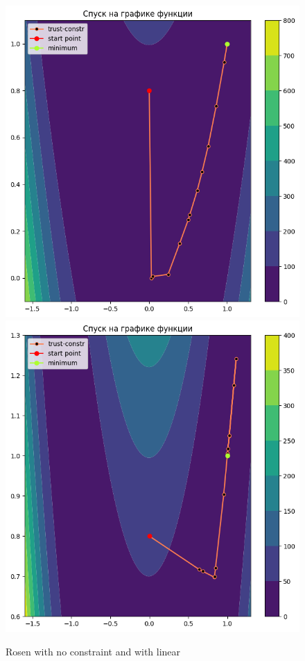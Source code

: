 \documentclass[12pt, a4paper, oneside, final]{article}
\begin{document}
	\begin{figure}[H]
		\centering
		\includegraphics[scale = 0.475]{Image/AT_ROSEN_NO_CONSTRAINT.png}
		\includegraphics[scale = 0.475]{Image/AT_ROSEN_LINEAR_CONSTRAINT.png}
		\caption*{Rosen with no constraint and with linear}
	\end{figure}
\end{document}
